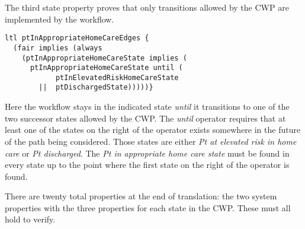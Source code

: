 The third state property proves that only transitions allowed by the CWP are implemented by the workflow.
%
{\small
\begin{lstlisting}[style=myPromela]
ltl ptInAppropriateHomeCareEdges {
  (fair implies (always 
    (ptInAppropriateHomeCareState implies (
      ptInAppropriateHomeCareState until (
            ptInElevatedRiskHomeCareState
        ||  ptDischargedState)))))}
\end{lstlisting}
}
%
\noindent Here the workflow stays in the indicated state \emph{until} it transitions to one of the two successor states allowed by the CWP.
The \emph{until} operator requires that at least one of the states on the right of the operator exists somewhere in the future of the path being considered.
Those states are either \emph{Pt at elevated risk in home care} or \emph{Pt discharged}.
The \emph{Pt in appropriate home care state} must be found in every state up to the point where the first state on the right of the operator is found. 

There are twenty total properties at the end of translation: the two system properties with the three properties for each state in the CWP.
These must all hold to verify.
